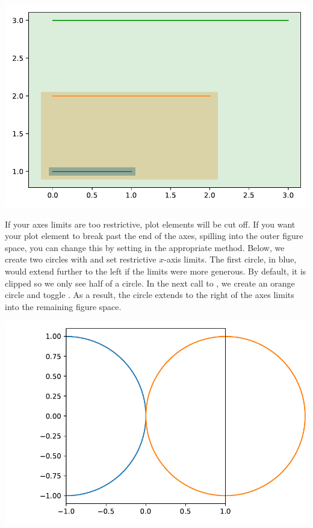 

\begin{center}
    \includegraphics[width = .6\textwidth]{figures/proseplots/expanding-lims.pdf}
\end{center}

If your axes limits are too restrictive, plot elements will be cut off. If you want your plot element to break past the end of the axes, spilling into the outer figure space, you can change this by setting  in the appropriate method. Below, we create two circles with  and set restrictive $x$-axis limits. The first circle, in blue, would extend further to the left if the limits were more generous. By default, it is clipped so we only see half of a circle. In the next call to , we create an orange circle and toggle . As a result, the circle extends to the right of the axes limits into the remaining figure space. 


\begin{center}
    \includegraphics[width = .7\textwidth]{figures/proseplots/circle-clip.pdf}
\end{center}

